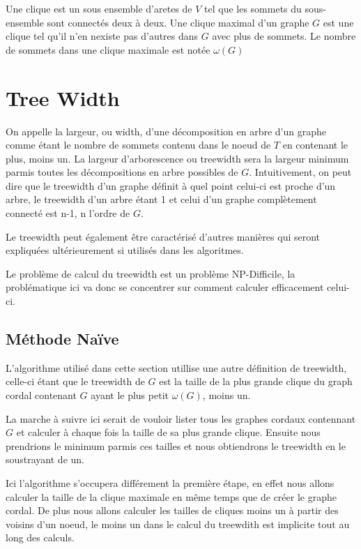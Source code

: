 \documentclass[a4paper, 12pt]{article}
\begin{document}
Une clique est un sous ensemble d'aretes de $V$ tel que les sommets du sous-ensemble sont connectés deux à deux. Une clique maximal d'un graphe $G$ est une clique tel qu'il n'en nexiste pas d'autres dans $G$ avec plus de sommets.  Le nombre de sommets dans une clique maximale est notée $\omega(G)$


 

\section{Tree Width}

On appelle la largeur, ou width, d'une décomposition en arbre d'un graphe 
comme étant le nombre de sommets contenu dans le noeud de $T$ en contenant 
le plus, moins un. La largeur d'arborescence ou treewidth sera la largeur 
minimum parmis toutes les décompositions en arbre possibles de $G$.
Intuitivement, on peut dire que le treewidth d'un graphe définit à quel point
celui-ci est proche d'un arbre, le treewidth d'un arbre étant 1 et celui d'un
graphe complètement connecté est n-1, n l'ordre de $G$.

Le treewidth peut également être caractérisé d'autres manières qui seront expliquées ultérieurement si utilisés dans les algoritmes.

Le problème de calcul du treewidth est un problème NP-Difficile, 
la problématique ici va donc se concentrer sur comment calculer
efficacement celui-ci.

\subsection{Méthode Naïve}
L'algorithme utilisé dans cette section utillise une autre définition de treewidth, celle-ci étant que le treewidth de $G$ est la taille de la plus grande clique du graph cordal contenant $G$ ayant le plus petit $\omega(G)$, moins un.

La marche à suivre ici serait de vouloir lister tous les graphes cordaux contennant $G$ et
calculer à chaque fois la taille de sa plus grande clique. Ensuite nous prendrions le minimum parmis ces tailles et nous obtiendrons le treewidth en le soustrayant de un.

Ici l'algorithme s'occupera différement la première étape, en effet nous allons
calculer la taille de la clique maximale en même temps que de créer le graphe cordal. 
De plus nous allons calculer les tailles de cliques moins un à partir des voisins d'un 
noeud, le moins un dans le calcul du treewdith est implicite tout au long des calculs.
\end{document}
